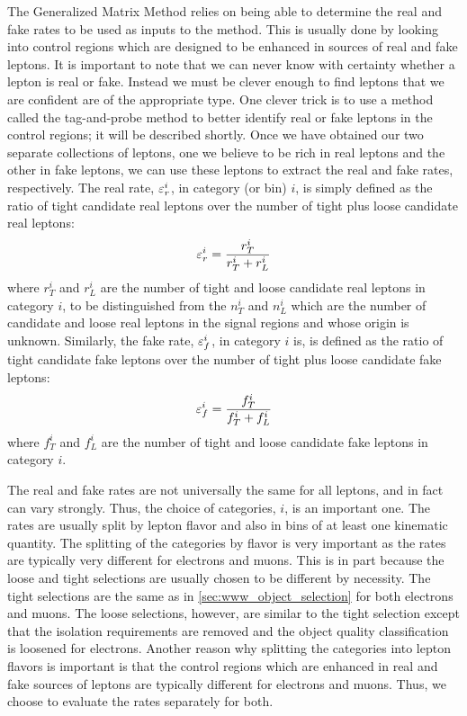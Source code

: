 The Generalized Matrix Method relies on being able to determine
the real and fake rates to be used as inputs to the method.
This is usually done by looking into control regions
which are designed to be enhanced in sources of real and fake leptons.
It is important to note that we can never know with certainty 
whether a lepton is real or fake. Instead we must be clever enough
to find leptons that we are confident are of the appropriate type.
One clever trick is to use a method called the tag-and-probe method
to better identify real or fake leptons in the control regions;
it will be described shortly.
Once we have obtained our two separate collections of leptons,
one we believe to be rich in real leptons and the other in fake leptons,
we can use these leptons to extract the real and fake rates, respectively.
The real rate, $\varepsilon_r^i$, in category (or bin) $i$,
is simply defined as the ratio of tight candidate real leptons
over the number of tight plus loose candidate real leptons:
\begin{equation}
\label{eq:real_rate}
\varepsilon_r^i = \frac{r_T^i}{r_T^i+r_L^i}
\end{equation}
where $r_T^i$ and $r_L^i$ are the number of tight and loose candidate
real leptons in category $i$, to be 
distinguished from the $n_T^i$ and $n_L^i$ which
are the number of candidate and loose real leptons in the signal regions
and whose origin is unknown.
Similarly, the fake rate, $\varepsilon_f^i$, in category $i$ is,
is defined as the ratio of tight candidate fake leptons over
the number of tight plus loose candidate fake leptons:
\begin{equation}
\label{eq:fake_rate}
\varepsilon_f^i = \frac{f_T^i}{f_T^i+f_L^i}
\end{equation}
where $f_T^i$ and $f_L^i$ are the number of tight and loose candidate
fake leptons in category $i$.

The real and fake rates are not universally the same for all leptons, 
and in fact can vary strongly. Thus, the choice of categories, $i$, is
an important one. The rates are usually split by lepton
flavor and also in bins of at least one kinematic quantity.
The splitting of the categories by flavor is 
very important as the rates are 
typically very different for electrons and muons. 
This is in part because
the loose and tight selections are usually chosen to be different
by necessity.
The tight selections are the same as in \sec\ref{sec:www_object_selection}
for both electrons and muons.  The loose selections, however,
are similar to the tight selection except that
the isolation requirements are removed and the object quality 
classification is loosened for electrons.
Another reason why splitting the categories into lepton flavors
is important is that 
the control regions which are enhanced in real and fake sources
of leptons are typically different for electrons and muons.
Thus, we choose to evaluate the rates separately for both.


